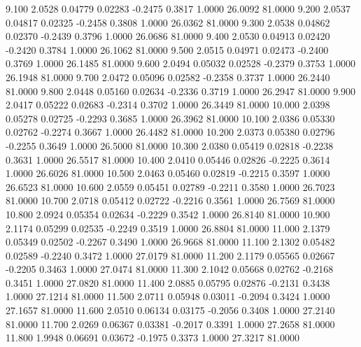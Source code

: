    9.100   2.0528   0.04779   0.02283  -0.2475   0.3817   1.0000  26.0092  81.0000
   9.200   2.0537   0.04817   0.02325  -0.2458   0.3808   1.0000  26.0362  81.0000
   9.300   2.0538   0.04862   0.02370  -0.2439   0.3796   1.0000  26.0686  81.0000
   9.400   2.0530   0.04913   0.02420  -0.2420   0.3784   1.0000  26.1062  81.0000
   9.500   2.0515   0.04971   0.02473  -0.2400   0.3769   1.0000  26.1485  81.0000
   9.600   2.0494   0.05032   0.02528  -0.2379   0.3753   1.0000  26.1948  81.0000
   9.700   2.0472   0.05096   0.02582  -0.2358   0.3737   1.0000  26.2440  81.0000
   9.800   2.0448   0.05160   0.02634  -0.2336   0.3719   1.0000  26.2947  81.0000
   9.900   2.0417   0.05222   0.02683  -0.2314   0.3702   1.0000  26.3449  81.0000
  10.000   2.0398   0.05278   0.02725  -0.2293   0.3685   1.0000  26.3962  81.0000
  10.100   2.0386   0.05330   0.02762  -0.2274   0.3667   1.0000  26.4482  81.0000
  10.200   2.0373   0.05380   0.02796  -0.2255   0.3649   1.0000  26.5000  81.0000
  10.300   2.0380   0.05419   0.02818  -0.2238   0.3631   1.0000  26.5517  81.0000
  10.400   2.0410   0.05446   0.02826  -0.2225   0.3614   1.0000  26.6026  81.0000
  10.500   2.0463   0.05460   0.02819  -0.2215   0.3597   1.0000  26.6523  81.0000
  10.600   2.0559   0.05451   0.02789  -0.2211   0.3580   1.0000  26.7023  81.0000
  10.700   2.0718   0.05412   0.02722  -0.2216   0.3561   1.0000  26.7569  81.0000
  10.800   2.0924   0.05354   0.02634  -0.2229   0.3542   1.0000  26.8140  81.0000
  10.900   2.1174   0.05299   0.02535  -0.2249   0.3519   1.0000  26.8804  81.0000
  11.000   2.1379   0.05349   0.02502  -0.2267   0.3490   1.0000  26.9668  81.0000
  11.100   2.1302   0.05482   0.02589  -0.2240   0.3472   1.0000  27.0179  81.0000
  11.200   2.1179   0.05565   0.02667  -0.2205   0.3463   1.0000  27.0474  81.0000
  11.300   2.1042   0.05668   0.02762  -0.2168   0.3451   1.0000  27.0820  81.0000
  11.400   2.0885   0.05795   0.02876  -0.2131   0.3438   1.0000  27.1214  81.0000
  11.500   2.0711   0.05948   0.03011  -0.2094   0.3424   1.0000  27.1657  81.0000
  11.600   2.0510   0.06134   0.03175  -0.2056   0.3408   1.0000  27.2140  81.0000
  11.700   2.0269   0.06367   0.03381  -0.2017   0.3391   1.0000  27.2658  81.0000
  11.800   1.9948   0.06691   0.03672  -0.1975   0.3373   1.0000  27.3217  81.0000
